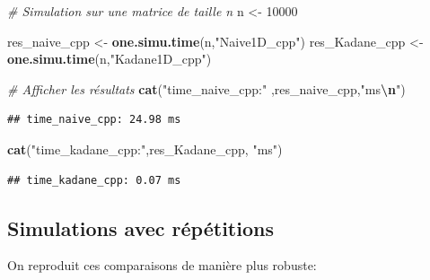 \documentclass[
]{article}
\newenvironment{Shaded}{\begin{snugshade}}{\end{snugshade}}
\newcommand{\CommentTok}[1]{\textcolor[rgb]{0.56,0.35,0.01}{\textit{#1}}}
\newcommand{\DecValTok}[1]{\textcolor[rgb]{0.00,0.00,0.81}{#1}}
\newcommand{\FunctionTok}[1]{\textcolor[rgb]{0.13,0.29,0.53}{\textbf{#1}}}
\newcommand{\NormalTok}[1]{#1}
\newcommand{\OtherTok}[1]{\textcolor[rgb]{0.56,0.35,0.01}{#1}}
\newcommand{\SpecialCharTok}[1]{\textcolor[rgb]{0.81,0.36,0.00}{\textbf{#1}}}
\newcommand{\StringTok}[1]{\textcolor[rgb]{0.31,0.60,0.02}{#1}}
\begin{document}
\begin{Shaded}
\begin{Highlighting}[]
\CommentTok{\# Simulation sur une matrice de taille n}
\NormalTok{n }\OtherTok{\textless{}{-}} \DecValTok{10000}

\NormalTok{res\_naive\_cpp }\OtherTok{\textless{}{-}} \FunctionTok{one.simu.time}\NormalTok{(n,}\StringTok{"Naive1D\_cpp"}\NormalTok{)}
\NormalTok{res\_Kadane\_cpp }\OtherTok{\textless{}{-}} \FunctionTok{one.simu.time}\NormalTok{(n,}\StringTok{"Kadane1D\_cpp"}\NormalTok{)}

\CommentTok{\# Afficher les résultats}
\FunctionTok{cat}\NormalTok{(}\StringTok{"time\_naive\_cpp:"}\NormalTok{ ,res\_naive\_cpp,}\StringTok{"ms}\SpecialCharTok{\textbackslash{}n}\StringTok{"}\NormalTok{)}
\end{Highlighting}
\end{Shaded}

\begin{verbatim}
## time_naive_cpp: 24.98 ms
\end{verbatim}

\begin{Shaded}
\begin{Highlighting}[]
\FunctionTok{cat}\NormalTok{(}\StringTok{"time\_kadane\_cpp:"}\NormalTok{,res\_Kadane\_cpp, }\StringTok{"ms"}\NormalTok{)}
\end{Highlighting}
\end{Shaded}

\begin{verbatim}
## time_kadane_cpp: 0.07 ms
\end{verbatim}

\subsection{Simulations avec
répétitions}\label{simulations-avec-ruxe9puxe9titions}

On reproduit ces comparaisons de manière plus robuste:
\end{document}
